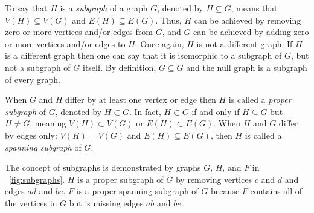 To say that \(H\) is a \emph{subgraph} of a graph \(G\), denoted by \(H\subseteq G\), means that \(V(H)\subseteq
V(G)\) and \(E(H)\subseteq E(G)\).  Thus, \(H\) can be achieved by removing zero or more vertices and/or edges from
\(G\), and \(G\) can be achieved by adding zero or more vertices and/or edges to \(H\).  Once again, \(H\) is not a
different graph.  If \(H\) is a different graph then one can say that it is isomorphic to a subgraph of \(G\), but
not a subgraph of \(G\) itself.  By definition, \(G\subseteq G\) and the null graph is a subgraph of every graph.

When \(G\) and \(H\) differ by at least one vertex or edge then \(H\) is called a \emph{proper subgraph} of \(G\),
denoted by \(H\subset G\).  In fact, \(H\subset G\) if and only if \(H\subseteq G\) but \(H\ne G\), meaning
\(V(H)\subset V(G)\) or \(E(H)\subset E(G)\).  When \(H\) and \(G\) differ by edges only: \(V(H)=V(G)\) and
\(E(H)\subseteq E(G)\), then \(H\) is called a \emph{spanning subgraph} of \(G\).

The concept of subgraphs is demonstrated by graphs \(G\), \(H\), and \(F\) in \figurename~\ref{fig:subgraphs}.
\(H\) is a proper subgraph of \(G\) by removing vertices \(c\) and \(d\) and edges \(ad\) and \(be\).  \(F\) is a
proper spanning subgraph of \(G\) because \(F\) contains all of the vertices in \(G\) but is missing edges \(ab\)
and \(be\).

